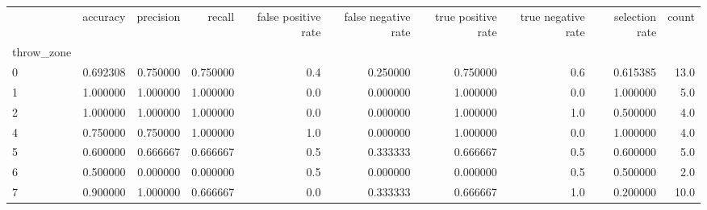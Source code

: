 \begin{tabular}{lrrrrrrrrr}
\toprule
{} &  accuracy &  precision &    recall &  false positive rate &  false negative rate &  true positive rate &  true negative rate &  selection rate &  count \\
throw\_zone &           &            &           &                      &                      &                     &                     &                 &        \\
\midrule
0          &  0.692308 &   0.750000 &  0.750000 &                  0.4 &             0.250000 &            0.750000 &                 0.6 &        0.615385 &   13.0 \\
1          &  1.000000 &   1.000000 &  1.000000 &                  0.0 &             0.000000 &            1.000000 &                 0.0 &        1.000000 &    5.0 \\
2          &  1.000000 &   1.000000 &  1.000000 &                  0.0 &             0.000000 &            1.000000 &                 1.0 &        0.500000 &    4.0 \\
4          &  0.750000 &   0.750000 &  1.000000 &                  1.0 &             0.000000 &            1.000000 &                 0.0 &        1.000000 &    4.0 \\
5          &  0.600000 &   0.666667 &  0.666667 &                  0.5 &             0.333333 &            0.666667 &                 0.5 &        0.600000 &    5.0 \\
6          &  0.500000 &   0.000000 &  0.000000 &                  0.5 &             0.000000 &            0.000000 &                 0.5 &        0.500000 &    2.0 \\
7          &  0.900000 &   1.000000 &  0.666667 &                  0.0 &             0.333333 &            0.666667 &                 1.0 &        0.200000 &   10.0 \\
\bottomrule
\end{tabular}
